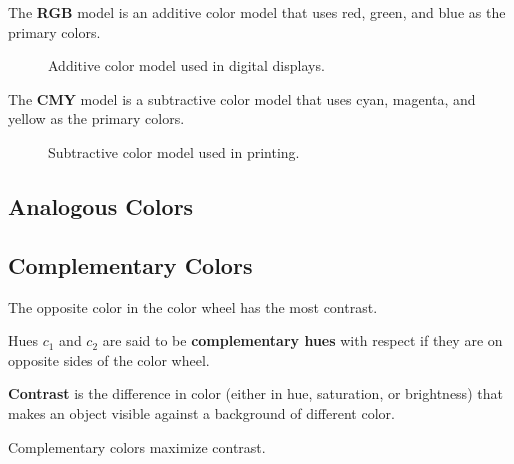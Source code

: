   \begin{example}
    \label{ex:rgb-additive}
    The \textbf{RGB} model is an additive color model that uses red, green, and blue as the primary colors. 
    \begin{figure}[H]
      \centering 
      \caption{Additive color model used in digital displays.} 
    \end{figure}
  \end{example} 

  \begin{example}
    \label{ex:cmy-subtractive}
    The \textbf{CMY} model is a subtractive color model that uses cyan, magenta, and yellow as the primary colors. 
    \begin{figure}[H]
      \centering 
      \caption{Subtractive color model used in printing.} 
    \end{figure}
  \end{example}

\subsection{Analogous Colors} 

\subsection{Complementary Colors}

  The opposite color in the color wheel has the most contrast. 

  \begin{definition}
    \label{def:complementary-colors}
    Hues $c_1$ and $c_2$ are said to be \textbf{complementary hues} with respect if they are on opposite sides of the color wheel.  
  \end{definition}

  \begin{definition}[Contrast]
    \label{def:contrast}
    \textbf{Contrast} is the difference in color (either in hue, saturation, or brightness) that makes an object visible against a background of different color. 
  \end{definition}

  \begin{theorem}
    \label{thm:contrast-in-complementary-colors}
    Complementary colors maximize contrast. 
  \end{theorem}

